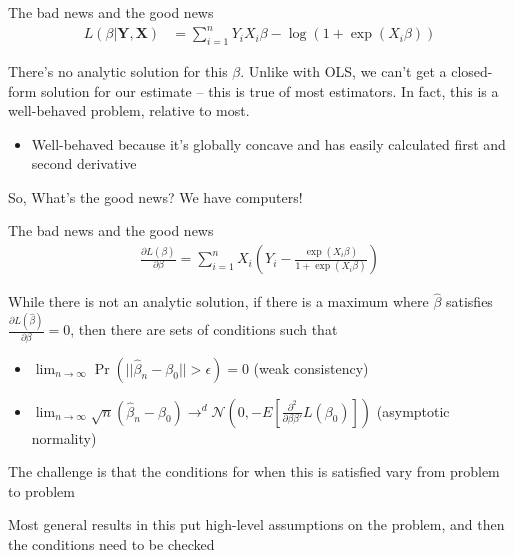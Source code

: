 \documentclass[notes,11pt, aspectratio=169]{beamer}
\newenvironment{wideitemize}{\itemize\addtolength{\itemsep}{10pt}}{\enditemize}
\begin{document}
  \begin{frame}{The bad news and the good news}
    \begin{align*}
      L(\beta|\mathbf{Y}, \mathbf{X}) &= \sum_{i=1}^{n} Y_{i}X_{i}\beta - \log(1+\exp(X_{i}\beta))
    \end{align*}
    \begin{wideitemize}
    \item    There's no analytic solution for this $\beta$. Unlike with OLS, we
    can't get a closed-form solution for our estimate -- this is true
    of most estimators. In fact, this is a well-behaved problem,
    relative to most.
    \begin{itemize}
    \item Well-behaved because it's globally concave and has easily
      calculated first and second derivative
      
    \end{itemize}
  \item     So,  What's the good news? We have computers!
    \end{wideitemize}

  \end{frame}

  \begin{frame}{The bad news and the good news}
    \begin{align*}
      \frac{\partial L(\beta)}{\partial \beta} =  \sum_{i=1}^{n} X_{i}(Y_{i} - \frac{\exp(X_{i}\beta)}{1+\exp(X_{i}\beta)})
    \end{align*}
    \begin{wideitemize}
    \item While there is not an analytic solution, if there is a
      maximum where $\hat{\beta}$ satisfies
      $\frac{\partial L(\hat{\beta})}{\partial \beta} = 0$, then there
      are sets of conditions such that
      \begin{itemize}
      \item $\lim_{n\to\infty}\Pr(||\hat{\beta}_{n} - \beta_{0}|| > \epsilon) = 0$ (weak consistency)
      \item $\lim_{n\to\infty} \sqrt{n} (\hat{\beta}_{n} - \beta_{0}) \rightarrow^{d} \mathcal{N}\left(0, -E\left[\frac{\partial^{2}}{\partial\beta \beta'}L(\beta_{0})\right]\right)$ (asymptotic normality)
      \end{itemize}
    \item The challenge is that the conditions for when this is
      satisfied vary from problem to problem
    \item Most general results in this put high-level assumptions on
      the problem, and then the conditions need to be checked
    \end{wideitemize}
    
  \end{frame}
\end{document}
